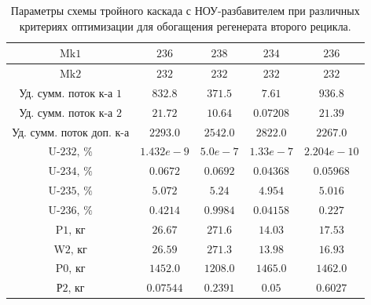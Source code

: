 \begin{table}
\begin{tabular}{ccccc}
        $\text{Mk1}$ & $236$ & $238$ & $234$ & $236$\\ \hline
        $\text{Mk2}$ & $232$ & $232$ & $232$ & $232$\\ \hline
        $\text{Уд. сумм. поток к-а 1}$ & $832.8$ & $371.5$ & $7.61$ & $936.8$\\ \hline
        $\text{Уд. сумм. поток к-а 2}$ & $21.72$ & $10.64$ & $0.07208$ & $21.39$\\ \hline
        $\text{Уд. сумм. поток доп. к-а}$ & $2293.0$ & $2542.0$ & $2822.0$ & $2267.0$\\ \hline
        $\text{U-232, \%}$ & $1.432e-9$ & $5.0e-7$ & $1.33e-7$ & $2.204e-10$\\ \hline
        $\text{U-234, \%}$ & $0.0672$ & $0.0692$ & $0.04368$ & $0.05968$\\ \hline
        $\text{U-235, \%}$ & $5.072$ & $5.24$ & $4.954$ & $5.016$\\ \hline
        $\text{U-236, \%}$ & $0.4214$ & $0.9984$ & $0.04158$ & $0.227$\\ \hline
        $\text{P1, кг}$ & $26.67$ & $271.6$ & $14.03$ & $17.53$\\ \hline
        $\text{W2, кг}$ & $26.59$ & $271.3$ & $13.98$ & $16.93$\\ \hline
        $\text{P0, кг}$ & $1452.0$ & $1208.0$ & $1465.0$ & $1462.0$\\ \hline
        $\text{Р2, кг}$ & $0.07544$ & $0.2391$ & $0.05$ & $0.6027$\\ \hline
    \end{tabular}        
\caption{Параметры схемы тройного каскада с НОУ-разбавителем при различных критериях оптимизации для обогащения регенерата второго рецикла.{\label{5opt2}}}
\end{table}


